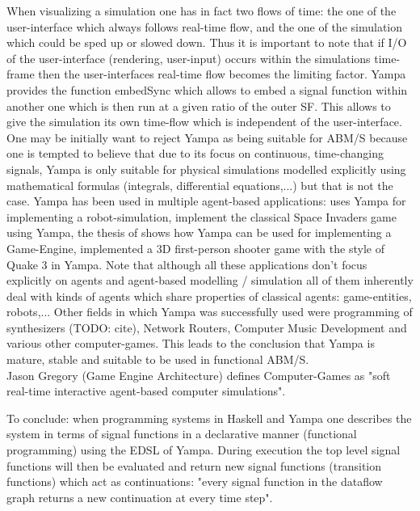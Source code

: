 When visualizing a simulation one has in fact two flows of time: the one of the user-interface which always follows real-time flow, and the one of the simulation which could be sped up or slowed down. Thus it is important to note that if I/O of the user-interface (rendering, user-input) occurs within the simulations time-frame then the user-interfaces real-time flow becomes the limiting factor. Yampa provides the function embedSync which allows to embed a signal function within another one which is then run at a given ratio of the outer SF. This allows to give the simulation its own time-flow which is independent of the user-interface. \\

One may be initially want to reject Yampa as being suitable for ABM/S because one is tempted to believe that due to its focus on continuous, time-changing signals, Yampa is only suitable for physical simulations modelled explicitly using mathematical formulas (integrals, differential equations,...) but that is not the case. Yampa has been used in multiple agent-based applications: \cite{Hudak2003} uses Yampa for implementing a robot-simulation, \cite{Courtney2003} implement the classical Space Invaders game using Yampa, the thesis of \cite{Meisinger2010} shows how Yampa can be used for implementing a Game-Engine, \cite{Frag2005} implemented a 3D first-person shooter game with the style of Quake 3 in Yampa. Note that although all these applications don't focus explicitly on agents and agent-based modelling / simulation all of them inherently deal with kinds of agents which share properties of classical agents: game-entities, robots,... Other fields in which Yampa was successfully used were programming of synthesizers (TODO: cite), Network Routers, Computer Music Development and various other computer-games. This leads to the conclusion that Yampa is mature, stable and suitable to be used in functional ABM/S. \\
Jason Gregory (Game Engine Architecture) defines Computer-Games as "soft real-time interactive agent-based computer simulations".

To conclude: when programming systems in Haskell and Yampa one describes the system in terms of signal functions in a declarative manner (functional programming) using the EDSL of Yampa. During execution the top level signal functions will then be evaluated and return new signal functions (transition functions) which act as continuations: "every signal function in the dataflow graph returns a new continuation at every time step".

